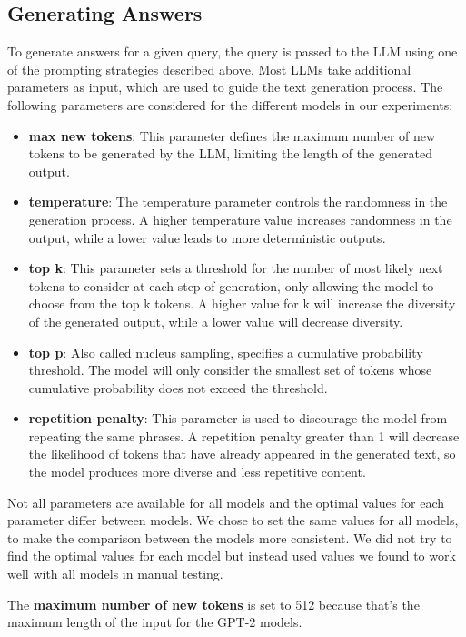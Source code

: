 \subsection{Generating Answers}
To generate answers for a given query, the query is passed to the LLM using one of the prompting strategies described above.
Most LLMs take additional parameters as input, which are used to guide the text generation process.
The following parameters are considered for the different models in our experiments:
\begin{itemize}
    \item \textbf{max new tokens}: This parameter defines the maximum number of new tokens to be generated by the LLM, limiting the length of the generated output.
    \item \textbf{temperature}: The temperature parameter controls the randomness in the generation process. A higher temperature value increases randomness in the output, while a lower value leads to more deterministic outputs.
    \item \textbf{top k}: This parameter sets a threshold for the number of most likely next tokens to consider at each step of generation, only allowing the model to choose from the top k tokens. A higher value for k will increase the diversity of the generated output, while a lower value will decrease diversity.
    \item \textbf{top p}:  Also called nucleus sampling, specifies a cumulative probability threshold. The model will only consider the smallest set of tokens whose cumulative probability does not exceed the threshold.
    \item \textbf{repetition penalty}: This parameter is used to discourage the model from repeating the same phrases. A repetition penalty greater than 1 will decrease the likelihood of tokens that have already appeared in the generated text, so the model produces more diverse and less repetitive content.
\end{itemize}
Not all parameters are available for all models and the optimal values for each parameter differ between models.
We chose to set the same values for all models, to make the comparison between the models more consistent.
We did not try to find the optimal values for each model but instead used values we found to work well with all models in manual testing.

The \textbf{maximum number of new tokens} is set to 512 because that's the maximum length of the input for the GPT-2 models.

